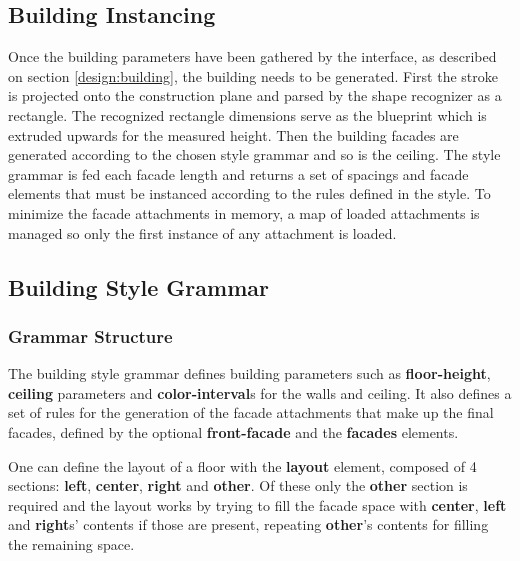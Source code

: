 

\subsection{Building Instancing}

Once the building parameters have been gathered by the interface, as described on section \ref{design:building},
the building needs to be generated.
First the stroke is projected onto the construction plane and parsed by the shape recognizer as a rectangle.
The recognized rectangle dimensions serve as the blueprint which is extruded upwards for the measured height.
Then the building facades are generated according to the chosen style grammar and so is the ceiling.
The style grammar is fed each facade length and returns a set of spacings and facade elements that must be instanced
according to the rules defined in the style.
To minimize the facade attachments in memory, a map of loaded attachments is managed so only the first instance of any
attachment is loaded.


\subsection{Building Style Grammar}

\subsubsection{Grammar Structure}

The building style grammar defines building parameters such as
\textbf{floor-height}, \textbf{ceiling} parameters and \textbf{color-interval}s for the walls and ceiling.
It also defines a set of rules for the generation of the facade attachments that make up the final facades,
defined by the optional \textbf{front-facade} and the \textbf{facades} elements.

One can define the layout of a floor with the \textbf{layout} element, composed of 4 sections:
\textbf{left}, \textbf{center}, \textbf{right} and \textbf{other}.
Of these only the \textbf{other} section is required and the layout works by trying to fill the facade space with \textbf{center}, \textbf{left} and \textbf{right}s' contents if those are present, repeating \textbf{other}'s contents for filling the remaining space.

